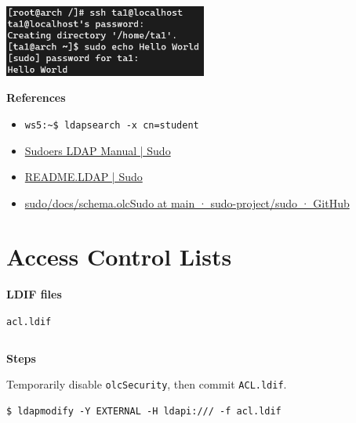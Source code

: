 \documentclass[12pt, a4paper]{article}
\begin{document}
\begin{enumerate}[label=(\alph*)]
    \includegraphics[width=0.5\textwidth]{2-d_ta1.png}

    \textbf{References}
    \begin{itemize}
      \item \verb|ws5:~$ ldapsearch -x cn=student|
      \item \href{https://www.sudo.ws/docs/man/1.8.17/sudoers.ldap.man/}{Sudoers LDAP Manual | Sudo}
      \item \href{https://www.sudo.ws/docs/readme/readme_ldap/}{README.LDAP | Sudo}
      \item \href{https://github.com/sudo-project/sudo/blob/main/docs/schema.olcSudo}{sudo/docs/schema.olcSudo at main · sudo-project/sudo · GitHub}
    \end{itemize}
  \end{enumerate}

  \section{Access Control Lists}
  \textbf{LDIF files}

  \verb|acl.ldif|
  \inputminted{ldif}{ldif/acl.ldif}

  \textbf{Steps}

  Temporarily disable \verb|olcSecurity|, then commit \verb|ACL.ldif|.
  \begin{Verbatim}[frame=single]
$ ldapmodify -Y EXTERNAL -H ldapi:/// -f acl.ldif
  \end{Verbatim}
\end{document}
